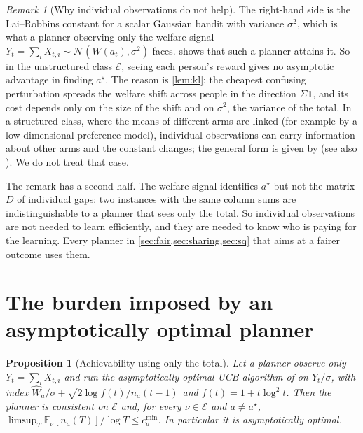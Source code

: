 \documentclass[11pt,a4paper]{article}
\theoremstyle{plain}
\newtheorem{proposition}[theorem]{Proposition}
\theoremstyle{definition}
\theoremstyle{remark}
\newtheorem{remark}[theorem]{Remark}
\newcommand{\E}{\mathbb{E}}
\newcommand{\cmin}{c^{\min}}
\newcommand{\astar}{a^\star}
\newcommand{\Env}{\mathcal{E}}
\begin{document}
\begin{remark}[Why individual observations do not help]\label{rem:noinfo}
The right-hand side is the Lai--Robbins constant for a scalar Gaussian bandit with variance $\sigma^2$, which is what a planner observing only the welfare signal $Y_t=\sum_iX_{t,i}\sim\mathcal N(W(a_t),\sigma^2)$ faces.  shows that such a planner attains it. So in the unstructured class $\Env$, seeing each person's reward gives no asymptotic advantage in finding $\astar$. The reason is \cref{lem:kl}: the cheapest confusing perturbation spreads the welfare shift across people in the direction $\Sigma\mathbf 1$, and its cost depends only on the size of the shift and on $\sigma^2$, the variance of the total. In a structured class, where the means of different arms are linked (for example by a low-dimensional preference model), individual observations can carry information about other arms and the constant changes; the general form is given by \citet{graves1997} (see also \citealp{combes2017}). We do not treat that case.

The remark has a second half. The welfare signal identifies $\astar$ but not the matrix $D$ of individual gaps: two instances with the same column sums are indistinguishable to a planner that sees only the total. So individual observations are not needed to learn efficiently, and they are needed to know who is paying for the learning. Every planner in \cref{sec:fair,sec:sharing,sec:sq} that aims at a fairer outcome uses them.
\end{remark}

\section{The burden imposed by an asymptotically optimal planner}\label{sec:exact}

\begin{proposition}[Achievability using only the total]\label{prop:upper}
Let a planner observe only $Y_t=\sum_iX_{t,i}$ and run the asymptotically optimal UCB algorithm of \citet[Chapter~8]{lattimore2020} on $Y_t/\sigma$, with index $\hat W_a/\sigma+\sqrt{2\log f(t)/n_a(t-1)}$ and $f(t)=1+t\log^2t$. Then the planner is consistent on $\Env$ and, for every $\nu\in\Env$ and $a\neq\astar$, $\limsup_T\E_\nu[n_a(T)]/\log T\le\cmin_a$. In particular it is asymptotically optimal.
\end{proposition}
\end{document}

